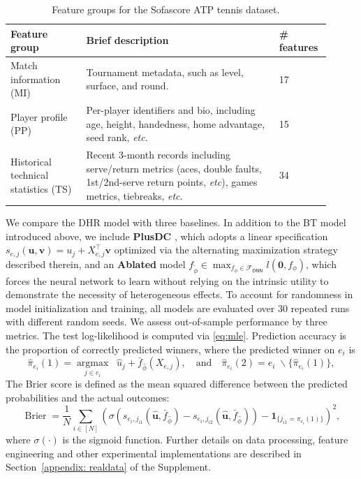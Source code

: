 \documentclass[
  12pt]{article}
\def\1{\bm{1}}
\begin{document}
\begin{table}[!ht]
\centering

\caption{Feature groups for the Sofascore ATP tennis dataset.}
\begin{tabular}{ 
    >{\raggedright\arraybackslash}m{0.22\linewidth} 
    >{\raggedright\arraybackslash}m{0.57\linewidth} 
    m{0.12\linewidth} 
}
\toprule
Feature group & Brief description & \# features \\
\midrule

Match information (MI) & 
Tournament metadata, such as level, surface, and round. & 
\hfill 17 \\
\addlinespace %

Player profile (PP) & 
Per-player identifiers and bio, including age, height, handedness, home advantage, seed rank, \textit{etc}. & 
\hfill 15 \\
\addlinespace

Historical technical statistics (TS) & 
Recent 3-month records including serve/return metrics (aces, double faults, 1st/2nd-serve return points, \textit{etc}), games metrics, tiebreaks, \textit{etc}. & 
\hfill 34 \\
\bottomrule
\end{tabular}
\label{tab:feature_groups}
\end{table}
We compare the DHR model with three baselines. In addition to the BT model introduced above, we include \textbf{PlusDC} 
\citep{dong2025statistical}, which adopts a linear specification $s_{e,j}(\boldsymbol{u}, \boldsymbol{v})=u_j+X_{e,j}^\top 
\boldsymbol{v}$ optimized via the alternating maximization strategy described therein, and an \textbf{Ablated} model $f_{\widetilde{\phi}} \in \max_{f_\phi \in \mathcal{F}_{\mathsf{DNN}}} l(\boldsymbol{0}, f_{\phi})$, which forces the neural network to learn without relying on the intrinsic utility to demonstrate the necessity of heterogeneous effects. To account for randomness in model initialization and training, all models are evaluated over 30 repeated runs with different random seeds. We assess out-of-sample performance by three metrics. The test log-likelihood is computed via \eqref{eq:mle}. Prediction accuracy is the proportion of correctly predicted winners, where the predicted winner on $e_i$ is $$\widehat{\pi}_{e_i}(1)= \underset{j\in e_i}{\operatorname{argmax}} \;\;\widehat{u}_j+\bar{f}_{\widehat{\phi}}(X_{e, j}), \quad \text{and} \quad \widehat{\pi}_{e_i}(2)= e_i \; \backslash \{\widehat{\pi}_{e_i}(1)\},$$ The Brier score is defined as the mean squared difference between the predicted probabilities and the actual outcomes: $$\operatorname{Brier} = \frac{1}{N}\sum_{i \in [N]} \left(\sigma(s_{e_i,j_{i1}}(\widehat{\boldsymbol{u}}, \bar{f}_{\widehat{\phi}})-s_{e_i,j_{i2}}(\widehat{\boldsymbol{u}}, \bar{f}_{\widehat{\phi}})) - \1_{\displaystyle\{ j_{i1}=\pi_{e_i}(1)\}} \right)^2,$$ where $\sigma(\cdot)$ is the sigmoid function. Further details on data processing, feature engineering and other experimental implementations are described in Section~\ref{appendix: realdata} of the Supplement.
\end{document}
